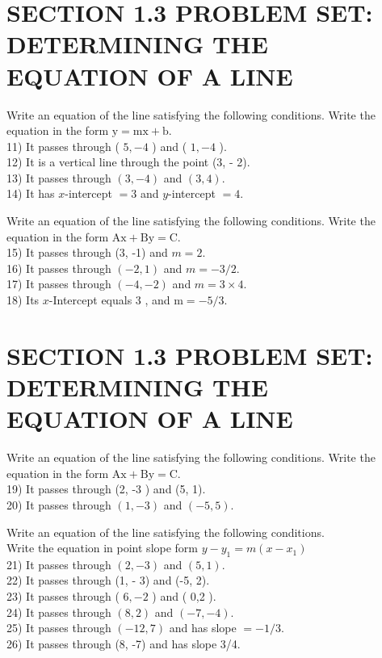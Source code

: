 \section*{SECTION 1.3 PROBLEM SET: DETERMINING THE EQUATION OF A LINE}
Write an equation of the line satisfying the following conditions. Write the equation in the form $\mathrm{y}=\mathrm{mx}+\mathrm{b}$.\\
11) It passes through ( $5,-4$ ) and ( $1,-4$ ).\\
12) It is a vertical line through the point (3, - 2).\\
13) It passes through $(3,-4)$ and $(3,4)$.\\
14) It has $x$-intercept $=3$ and $y$-intercept $=4$.

Write an equation of the line satisfying the following conditions. Write the equation in the form $\mathrm{Ax}+\mathrm{By}=\mathrm{C}$.\\
15) It passes through (3, -1) and $m=2$.\\
16) It passes through $(-2,1)$ and $m=-3 / 2$.\\
17) It passes through $(-4,-2)$ and $m=3 \times 4$.\\
18) Its $x$-Intercept equals 3 , and $\mathrm{m}=-5 / 3$.

\section*{SECTION 1.3 PROBLEM SET: DETERMINING THE EQUATION OF A LINE}
Write an equation of the line satisfying the following conditions. Write the equation in the form $\mathrm{Ax}+\mathrm{By}=\mathrm{C}$.\\
19) It passes through (2, -3 ) and (5, 1).\\
20) It passes through $(1,-3)$ and $(-5,5)$.

Write an equation of the line satisfying the following conditions.\\
Write the equation in point slope form $y-y_{1}=m\left(x-x_{1}\right)$\\
21) It passes through $(2,-3)$ and $(5,1)$.\\
22) It passes through (1, - 3) and (-5, 2).\\
23) It passes through ( $6,-2$ ) and ( 0,2 ).\\
24) It passes through $(8,2)$ and $(-7,-4)$.\\
25) It passes through $(-12,7)$ and has slope $=-1 / 3$.\\
26) It passes through (8, -7) and has slope 3/4.

